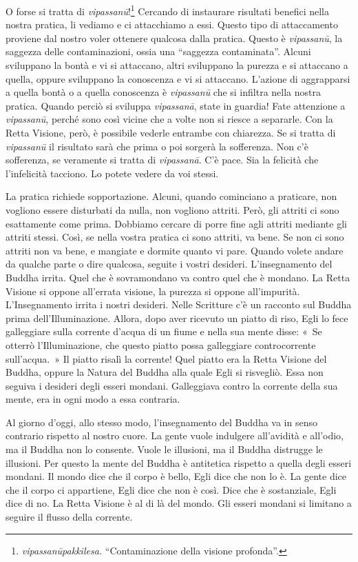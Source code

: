 O forse si tratta di \emph{vipassanū}!\footnote{\emph{vipassanūpakkilesa.}
  ``Contaminazione della visione profonda''.} Cercando di instaurare
risultati benefici nella nostra pratica, li vediamo e ci attacchiamo a
essi. Questo tipo di attaccamento proviene dal nostro voler ottenere
qualcosa dalla pratica. Questo è \emph{vipassanū}, la saggezza delle
contaminazioni, ossia una ``saggezza contaminata''. Alcuni sviluppano la
bontà e vi si attaccano, altri sviluppano la purezza e si attaccano a
quella, oppure sviluppano la conoscenza e vi si attaccano. L'azione di
aggrapparsi a quella bontà o a quella conoscenza è \emph{vipassanū} che
si infiltra nella nostra pratica. Quando perciò si sviluppa
\emph{vipassanā}, state in guardia! Fate attenzione a \emph{vipassanū},
perché sono così vicine che a volte non si riesce a separarle. Con la
Retta Visione, però, è possibile vederle entrambe con chiarezza. Se si
tratta di \emph{vipassanū} il risultato sarà che prima o poi sorgerà la
sofferenza. Non c'è sofferenza, se veramente si tratta di
\emph{vipassanā}. C'è pace. Sia la felicità che l'infelicità tacciono.
Lo potete vedere da voi stessi.

La pratica richiede sopportazione. Alcuni, quando cominciano a
praticare, non vogliono essere disturbati da nulla, non vogliono
attriti. Però, gli attriti ci sono esattamente come prima. Dobbiamo
cercare di porre fine agli attriti mediante gli attriti stessi. Così, se
nella vostra pratica ci sono attriti, va bene. Se non ci sono attriti
non va bene, e mangiate e dormite quanto vi pare. Quando volete andare
da qualche parte o dire qualcosa, seguite i vostri desideri.
L'insegnamento del Buddha irrita. Quel che è sovramondano va contro
quel che è mondano. La Retta Visione si oppone all'errata visione, la
purezza si oppone all'impurità. L'Insegnamento irrita i nostri desideri.
Nelle Scritture c'è un racconto sul Buddha prima dell'Illuminazione.
Allora, dopo aver ricevuto un piatto di riso, Egli lo fece galleggiare
sulla corrente d'acqua di un fiume e nella sua mente disse: «~Se otterrò
l'Illuminazione, che questo piatto possa galleggiare controcorrente
sull'acqua.~» Il piatto risalì la corrente! Quel piatto era la Retta
Visione del Buddha, oppure la Natura del Buddha alla quale Egli si
risvegliò. Essa non seguiva i desideri degli esseri mondani. Galleggiava
contro la corrente della sua mente, era in ogni modo a essa contraria.

Al giorno d'oggi, allo stesso modo, l'insegnamento del Buddha va in
senso contrario rispetto al nostro cuore. La gente vuole indulgere
all'avidità e all'odio, ma il Buddha non lo consente. Vuole le
illusioni, ma il Buddha distrugge le illusioni. Per questo la mente del
Buddha è antitetica rispetto a quella degli esseri mondani. Il mondo
dice che il corpo è bello, Egli dice che non lo è. La gente dice che il
corpo ci appartiene, Egli dice che non è così. Dice che è sostanziale,
Egli dice di no. La Retta Visione è al di là del mondo. Gli esseri
mondani si limitano a seguire il flusso della corrente.

